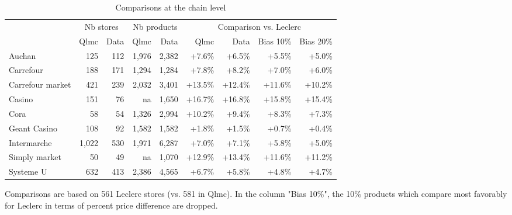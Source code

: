 \documentclass[english]{article}
\begin{document}
\begin{table}[htbp]
\caption{Comparisons at the chain level}
\label{tab:qlmc_chain_comparisons}
\begin{threeparttable}
\begin{tabular}{lrr|rr|rrrr}
\toprule
\toprule
          & \multicolumn{2}{c|}{Nb stores} &  \multicolumn{2}{c|}{Nb products} & \multicolumn{4}{c}{Comparison vs. Leclerc} \\
           & Qlmc  & Data  & Qlmc  & Data  & Qlmc  & Data  & Bias 10\% & Bias 20\% \\
\midrule
    Auchan & 125   & 112   & 1,976 & 2,382 & +7.6\% & +6.5\% & +5.5\% & +5.0\% \\
    Carrefour & 188   & 171   & 1,294 & 1,284 & +7.8\% & +8.2\% & +7.0\% & +6.0\% \\
    Carrefour market & 421   & 239   & 2,032 & 3,401 & +13.5\% & +12.4\% & +11.6\% & +10.2\% \\
    Casino & 151   & 76    & na    & 1,650 & +16.7\% & +16.8\% & +15.8\% & +15.4\% \\
    Cora  & 58    & 54    & 1,326 & 2,994 & +10.2\% & +9.4\% & +8.3\% & +7.3\% \\
    Geant Casino & 108   & 92    & 1,582 & 1,582 & +1.8\% & +1.5\% & +0.7\% & +0.4\% \\
    Intermarche & 1,022 & 530   & 1,971 & 6,287 & +7.0\% & +7.1\% & +5.8\% & +5.0\% \\
    Simply market & 50    & 49    & na    & 1,070 & +12.9\% & +13.4\% & +11.6\% & +11.2\% \\
    Systeme U & 632   & 413   & 2,386 & 4,565 & +6.7\% & +5.8\% & +4.8\% & +4.7\% \\
\bottomrule
\bottomrule
\end{tabular}
\begin{tablenotes}
      \small
      \item Comparisons are based on 561 Leclerc stores (vs. 581 in Qlmc). In the column "Bias 10\%", the 10\% products which compare most favorably for Leclerc in terms of percent price difference are dropped.
\end{tablenotes}
\end{threeparttable}
\end{table}
\end{document}
